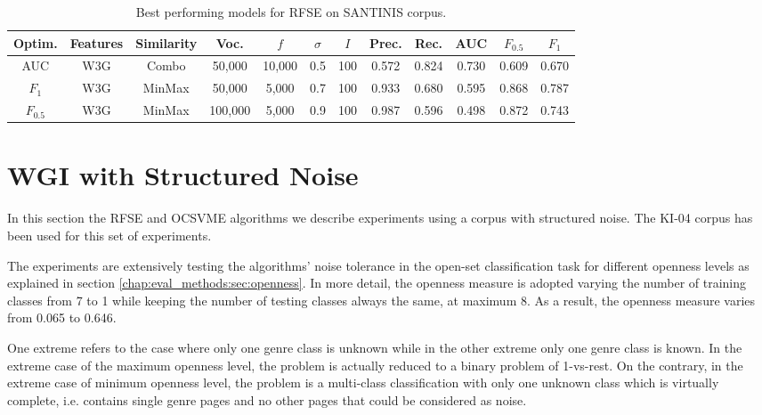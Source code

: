 \begin{table}[t]
\center
\caption{Best performing models for RFSE on SANTINIS corpus.}\label{chap:noise:tbl:RFSE_SANTINIS}
\begin{adjustbox}{width=\textwidth}
\begin{tabular}{c c c c c c c c c c c c}
	\hline
	Optim. & Features & Similarity & Voc. & $f$ & $\sigma$ & $I$ & Prec. & Rec. & AUC & $F_{0.5}$ & $F_{1}$ \\
	\hline
	AUC & W3G & Combo & 50,000 & 10,000 & 0.5 & 100 & 0.572 & 0.824 & 0.730 & 0.609 & 0.670\\
	$F_{1}$ & W3G & MinMax & 50,000 & 5,000 & 0.7 & 100 & 0.933 & 0.680 & 0.595  & 0.868 & 0.787\\
	$F_{0.5}$ & W3G & MinMax & 100,000 & 5,000 & 0.9 & 100 & 0.987 & 0.596 & 0.498 & 0.872 & 0.743\\
	\hline
\end{tabular}

\end{adjustbox}	

\end{table}


\section{WGI with Structured Noise}
\label{chap:noise:sec:openness_evaluation}

In this section the RFSE and OCSVME algorithms we describe experiments using a corpus with structured noise. The KI-04 corpus has been used for this set of experiments. 

The experiments are extensively testing the algorithms' noise tolerance in the open-set classification task for different openness levels as explained in section \ref{chap:eval_methods:sec:openness}. In more detail, the openness measure is adopted varying the number of training classes from 7 to 1 while keeping the number of testing classes always the same, at maximum 8. As a result, the openness measure varies from 0.065 to 0.646. 

One extreme refers to the case where only one genre class is unknown while in the other extreme only one genre class is known. In the extreme case of the maximum openness level, the problem is actually reduced to a binary problem of 1-vs-rest. On the contrary, in the extreme case of minimum openness level, the problem is a multi-class classification with only one unknown class which is virtually complete, i.e. contains single genre pages and no other pages that could be considered as noise.

